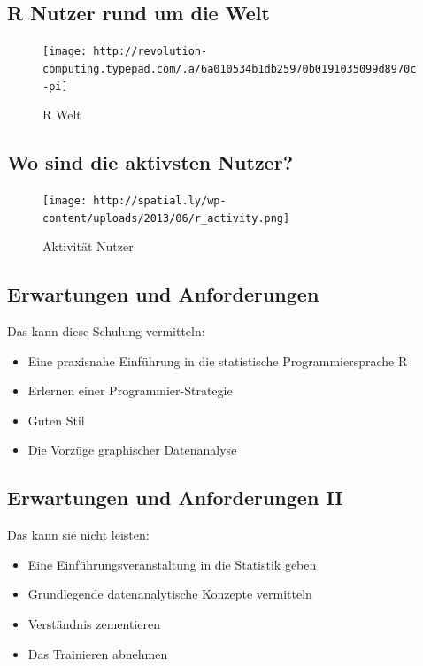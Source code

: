 \documentclass[]{article}
\providecommand{\tightlist}{%
  \setlength{\itemsep}{0pt}\setlength{\parskip}{0pt}}
\begin{document}
\subsection{R Nutzer rund um die Welt}\label{r-nutzer-rund-um-die-welt}

\begin{figure}[htbp]
\centering
\texttt{[image: http://revolution-computing.typepad.com/.a/6a010534b1db25970b0191035099d8970c-pi]}
\caption{R Welt}
\end{figure}

\subsection{Wo sind die aktivsten
Nutzer?}\label{wo-sind-die-aktivsten-nutzer}

\begin{figure}[htbp]
\centering
\texttt{[image: http://spatial.ly/wp-content/uploads/2013/06/r\_activity.png]}
\caption{Aktivität Nutzer}
\end{figure}

\subsection{Erwartungen und
Anforderungen}\label{erwartungen-und-anforderungen}

Das kann diese Schulung vermitteln:

\begin{itemize}
\tightlist
\item
  Eine praxisnahe Einführung in die statistische Programmiersprache R
\item
  Erlernen einer Programmier-Strategie
\item
  Guten Stil
\item
  Die Vorzüge graphischer Datenanalyse
\end{itemize}

\subsection{Erwartungen und Anforderungen
II}\label{erwartungen-und-anforderungen-ii}

Das kann sie nicht leisten:

\begin{itemize}
\tightlist
\item
  Eine Einführungsveranstaltung in die Statistik geben
\item
  Grundlegende datenanalytische Konzepte vermitteln
\item
  Verständnis zementieren
\item
  Das Trainieren abnehmen
\end{itemize}
\end{document}
